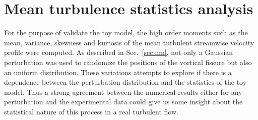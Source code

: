 \documentclass[aps,reprint,amsmath,amssymb,pra]{revtex4-1}%
\begin{document}
\section{Mean turbulence statistics analysis}
For the purpose of validate the toy model, the high order moments such as the mean, variance, skewness and kurtosis of the mean turbulent streamwise velocity profile were computed. As described in Sec.~\ref{sec:nm}, not only a Gaussian perturbation was used to randomize the positions of the vortical fissure but also an uniform distribution. These variations attempts to explore if there is a dependence between the perturbation distribution and the statistics of the toy model. Thus a strong agreement between the numerical results either for any perturbation and the experimental data could give us some insight about the statistical nature of this process in a real turbulent flow.
\end{document}

